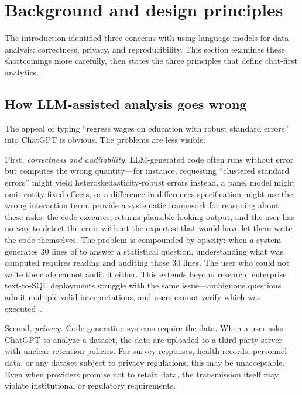 
\section{Background and design principles} \label{sec:defining}

The introduction identified three concerns with using language models for
data analysis: correctness, privacy, and reproducibility. This section
examines these shortcomings more carefully, then states the three
principles that define chat-first analytics.

\subsection{How LLM-assisted analysis goes wrong}

The appeal of typing ``regress wages on education with robust standard
errors'' into ChatGPT is obvious. The problems are less visible.

First, \emph{correctness and auditability.} LLM-generated code often runs
without error but computes the wrong quantity---for instance, requesting
``clustered standard errors'' might yield heteroskedasticity-robust
errors instead, a panel model might omit entity fixed effects, or a
difference-in-differences specification might use the wrong interaction
term. \citet{Ludwig+Mullainathan+Rambachan:2025} provide a systematic
framework for reasoning about these risks: the code executes, returns
plausible-looking output, and the user has no way to detect the error
without the expertise that would have let them write the code
themselves. The problem is
compounded by opacity: when a system generates 30 lines of
 to answer a statistical question, understanding what
was computed requires reading and auditing those 30 lines. The user
who could not write the code cannot audit it either. This extends
beyond research: enterprise text-to-SQL deployments struggle with the
same issue---ambiguous questions admit multiple valid interpretations,
and users cannot verify which was
executed~\citep{Renggli+Ilyas+Rekatsinas:2025}.

Second, \emph{privacy.} Code-generation systems require the data.
When a user asks ChatGPT to analyze a dataset, the data are uploaded
to a third-party server with unclear retention policies. For survey
responses, health records, personnel data, or any dataset subject to
privacy regulations, this may be unacceptable. Even when providers
promise not to retain data, the transmission itself may violate
institutional or regulatory requirements.

